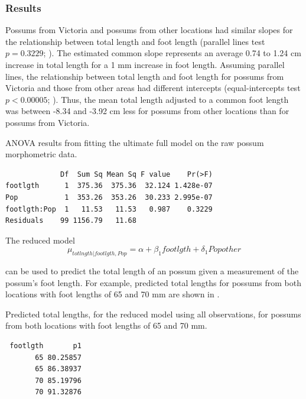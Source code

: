 \documentclass[10pt,openany]{book}\usepackage[]{graphicx}\usepackage[]{color}
\makeatletter
\newenvironment{kframe}{%
 \def\at@end@of@kframe{}%
 \ifinner\ifhmode%
  \def\at@end@of@kframe{\end{minipage}}%
  \begin{minipage}{\columnwidth}%
 \fi\fi%
 \def\FrameCommand##1{\hskip\@totalleftmargin \hskip-\fboxsep
 \colorbox{shadecolor}{##1}\hskip-\fboxsep
     \hskip-\linewidth \hskip-\@totalleftmargin \hskip\columnwidth}%
 \MakeFramed {\advance\hsize-\width
   \@totalleftmargin\z@ \linewidth\hsize
   \@setminipage}}%
 {\par\unskip\endMakeFramed%
 \at@end@of@kframe}
\newenvironment{knitrout}{}{} %
\makeatother
\begin{document}
\subsubsection*{Results}

Possums from Victoria and possums from other locations had similar slopes for the relationship between total length and foot length (parallel lines test $p=0.3229$; ).  The estimated common slope represents an average 0.74 to 1.24 cm increase in total length for a 1 mm increase in foot length.  Assuming parallel lines, the relationship between total length and foot length for possums from Victoria and those from other areas had different intercepts (equal-intercepts test $p<0.00005$; ).  Thus, the mean total length adjusted to a common foot length was between -8.34 and -3.92 cm less for possums from other locations than for possums from Victoria.

\begin{table}[h]
  \centering
  \caption{ANOVA results from fitting the ultimate full model on the raw possum morphometric data.}\label{tab:IVROpTest1}
\begin{knitrout}
\color{fgcolor}\begin{kframe}
\begin{verbatim}
             Df  Sum Sq Mean Sq F value    Pr(>F)
footlgth      1  375.36  375.36  32.124 1.428e-07
Pop           1  353.26  353.26  30.233 2.995e-07
footlgth:Pop  1   11.53   11.53   0.987    0.3229
Residuals    99 1156.79   11.68                  
\end{verbatim}
\end{kframe}
\end{knitrout}
\end{table}

The reduced model
\[ \mu_{totlngth|footlgth,Pop} = \alpha + \beta_{1}footlgth + \delta_{1}Popother  \]

can be used to predict the total length of an possum given a measurement of the possum's foot length.  For example, predicted total lengths for possums from both locations with foot lengths of 65 and 70 mm are shown in .

\begin{table}[h]
  \centering
  \caption{Predicted total lengths, for the reduced model using all observations, for possums from both locations with foot lengths of 65 and 70 mm.}\label{tab:IVROpPreds1}
\begin{knitrout}
\color{fgcolor}\begin{kframe}
\begin{verbatim}
 footlgth       p1
       65 80.25857
       65 86.38937
       70 85.19796
       70 91.32876
\end{verbatim}
\end{kframe}
\end{knitrout}
\end{table}
\end{document}
